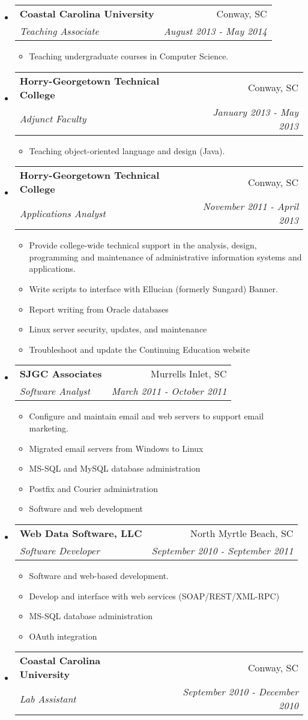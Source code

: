 \documentclass[letterpaper,11pt]{article}
\makeatletter
\newcommand{\resitem}[1]{\item #1 \vspace{-2pt}}
\newcommand{\ressubheading}[4]{
\begin{tabular*}{6.5in}{l@{\cftdotfill{\cftsecdotsep}\extracolsep{\fill}}r}
		\textbf{#1} & #2 \\
		\textit{#3} & \textit{#4} \\
\end{tabular*}\vspace{-6pt}}
\makeatother
\begin{document}
\begin{itemize}
\item
	\ressubheading{Coastal Carolina University}{Conway, SC}{Teaching Associate}{August 2013 - May 2014}
	\begin{itemize}
		\resitem{Teaching undergraduate courses in Computer Science.}
	\end{itemize}
	
\item
	\ressubheading{Horry-Georgetown Technical College}{Conway, SC}{Adjunct Faculty}{January 2013 - May 2013}
	\begin{itemize}
		\resitem{Teaching object-oriented language and design (Java).}
	\end{itemize}
	
\item
	\ressubheading{Horry-Georgetown Technical College}{Conway, SC}{Applications Analyst}{November 2011 - April 2013}
	\begin{itemize}
		\resitem{Provide college-wide technical support in the analysis, design, programming and maintenance of administrative information systems and applications.}
		\item Write scripts to interface with Ellucian (formerly Sungard) Banner.
		\item  Report writing from Oracle databases
		\item Linux server security, updates, and maintenance
		\item Troubleshoot and update the Continuing Education website
	\end{itemize}		
	
\item
	\ressubheading{SJGC Associates}{Murrells Inlet, SC}{Software Analyst}{March 2011 - October 2011}
	\begin{itemize}
		\resitem{Configure and maintain email and web servers to support email marketing.}
		\item Migrated email servers from Windows to Linux
		\item  MS-SQL and MySQL database administration
		\item Postfix and Courier administration
		\item Software and web development
	\end{itemize}	
	
	
\item
	\ressubheading{Web Data Software, LLC}{North Myrtle Beach, SC}{Software Developer}{September 2010 - September 2011}
	\begin{itemize}
		\resitem{Software and web-based development.}
		\item Develop and interface with web services (SOAP/REST/XML-RPC)
		\item MS-SQL database administration
		\item  OAuth integration
	\end{itemize}	
	
\item
	\ressubheading{Coastal Carolina University}{Conway, SC}{Lab Assistant}{September 2010 - December 2010}
\end{itemize}
\end{document}
